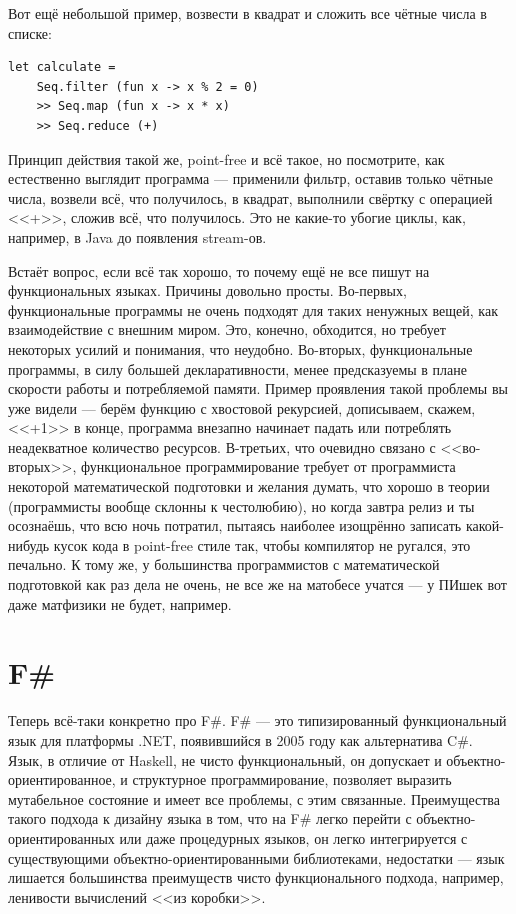 \documentclass[a5paper]{article}
\begin{document}
Вот ещё небольшой пример, возвести в квадрат и сложить все чётные числа в списке:

\begin{verbatim}
let calculate = 
    Seq.filter (fun x -> x % 2 = 0) 
    >> Seq.map (fun x -> x * x) 
    >> Seq.reduce (+)
\end{verbatim}

Принцип действия такой же, point-free и всё такое, но посмотрите, как естественно выглядит программа --- применили фильтр, оставив только чётные числа, возвели всё, что получилось, в квадрат, выполнили свёртку с операцией <<+>>, сложив всё, что получилось. Это не какие-то убогие циклы, как, например, в Java до появления stream-ов.

Встаёт вопрос, если всё так хорошо, то почему ещё не все пишут на функциональных языках. Причины довольно просты. Во-первых, функциональные программы не очень подходят для таких ненужных вещей, как взаимодействие с внешним миром. Это, конечно, обходится, но требует некоторых усилий и понимания, что неудобно. Во-вторых, функциональные программы, в силу большей декларативности, менее предсказуемы в плане скорости работы и потребляемой памяти. Пример проявления такой проблемы вы уже видели --- берём функцию с хвостовой рекурсией, дописываем, скажем, <<+1>> в конце, программа внезапно начинает падать или потреблять неадекватное количество ресурсов. В-третьих, что очевидно связано с <<во-вторых>>, функциональное программирование требует от программиста некоторой математической подготовки и желания думать, что хорошо в теории (программисты вообще склонны к честолюбию), но когда завтра релиз и ты осознаёшь, что всю ночь потратил, пытаясь наиболее изощрённо записать какой-нибудь кусок кода в point-free стиле так, чтобы компилятор не ругался, это печально. К тому же, у большинства программистов с математической подготовкой как раз дела не очень, не все же на матобесе учатся --- у ПИшек вот даже матфизики не будет, например.

\section{F\#}

Теперь всё-таки конкретно про F\#. F\# --- это типизированный функциональный язык для платформы .NET, появившийся в 2005 году как альтернатива C\#. Язык, в отличие от Haskell, не чисто функциональный, он допускает и объектно-ориентированное, и структурное программирование, позволяет выразить мутабельное состояние и имеет все проблемы, с этим связанные. Преимущества такого подхода к дизайну языка в том, что на F\# легко перейти с объектно-ориентированных или даже процедурных языков, он легко интегрируется с существующими объектно-ориентированными библиотеками, недостатки --- язык лишается большинства преимуществ чисто функционального подхода, например, ленивости вычислений <<из коробки>>.
\end{document}

